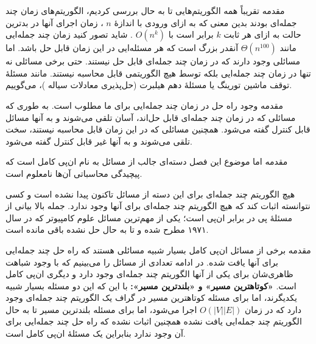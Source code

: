 \begin{itemframe}{مقدمه}
\itm
تقریباً همه الگوریتم‌هایی تا به حال بررسی کردیم، الگوریتم‌های زمان چند جمله‌ای
 بودند بدین معنی که به ازای ورودی با اندازهٔ
$n$
، زمان اجرای آنها در بدترین حالت به ازای هر ثابت
$k$
برابر است با
$O(n^k)$ .
\itm
شاید تصور کنید زمان چند جمله‌ایی مانند
$\Theta(n^{100})$
آنقدر بزرگ است که هر مسئله‌ایی در این زمان قابل حل باشد. اما مسائلی وجود دارند که در زمان چند جمله‌ای قابل حل نیستند.
\itm
حتی برخی مسائلی نه تنها در زمان چند جمله‌ایی‌ بلکه توسط هیچ الگوریتمی قابل محاسبه نیستند.
مانند مسئلهٔ توقف ماشین تورینگ
یا مسئلهٔ دهم هیلبرت (حل‌پذیری معادلات سیاله
)،
می‌گوییم.
\end{itemframe}

\begin{itemframe}{مقدمه}
\itm
وجود راه حل در زمان چند جمله‌ایی برای ما مطلوب است.
\sub
به طوری که مسائلی که در زمان چند جمله‌ای قابل حل‌اند، آسان تلقی می‌شوند و به آنها مسائل قابل کنترل
 گفته می‌شود.
\sub
 همچنین مسائلی که در این زمان قابل محاسبه نیستند، سخت تلقی می‌شوند و به آنها غیر قابل کنترل
گفته می‌شود.
\end{itemframe}

\begin{itemframe}{مقدمه}
\itm
اما موضوع این فصل دسته‌ای جالب از مسائل به نام ان‌پی کامل
است که پیچیدگی محاسباتی آن‌ها نامعلوم است.

\itm
هیچ الگوریتم چند جمله‌ای برای این دسته از مسائل تاکنون پیدا نشده است و کسی نتوانسته اثبات کند که هیچ الگوریتم چند جمله‌ای برای آنها وجود ندارد.
\itm
جمله بالا بیانی از مسئلهٔ پی در برابر ان‌پی
است؛ یکی از مهم‌ترین مسائل علوم کامپیوتر که در سال ۱۹۷۱ مطرح شده و تا به حال حل نشده باقی مانده است.
\end{itemframe}

\begin{itemframe}{مقدمه}
\itm
برخی از مسائل ان‌پی کامل بسیار شبیه مسائلی هستند که راه حل چند جمله‌ایی برای آنها یافت شده. در ادامه تعدادی از مسائل را می‌بینیم که با وجود شباهت ظاهری‌شان برای یکی از آنها الگوریتم چند جمله‌ای وجود دارد و دیگری ان‌پی کامل است.
\itm
\textbf{«کوتاهترین مسیر» و «بلندترین مسیر»:}
با این که این دو مسئله بسیار شبیه یکدیگرند، اما برای مسئله کوتاهترین مسیر در گراف یک الگوریتم چند جمله‌ای وجود دارد که در زمان
$O(|V||E|)$
 اجرا می‌شود، اما برای مسئله بلندترین مسیر تا به حال الگوریتم چند جمله‌ایی یافت نشده همچنین اثبات نشده که راه حل چند جمله‌ایی برای آن وجود ندارد بنابراین یک مسئلهٔ ان‌پی کامل است.
\end{itemframe}


